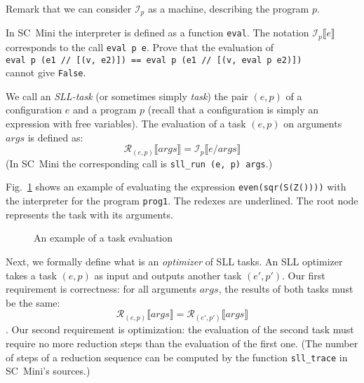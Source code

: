Remark that we can consider $\mathcal{I}_p$ as a machine, describing the program $p$.

\begin{exercise}
In SC~Mini the interpreter is defined as a function \texttt{eval}.
The notation $\mathcal{I}_p\llbracket e \rrbracket$ corresponds to the call \texttt{eval p e}.
Prove that the evaluation of
\\
\texttt{eval p (e1 // [(v, e2)]) == eval p (e1 // [(v, eval p e2)])}
\\
cannot give \texttt{False}.
\end{exercise}

We call an \emph{SLL-task}
(or sometimes simply \emph{task}) the pair $(e, p)$
of a configuration $e$ and a program $p$
(recall that a configuration is simply an expression with free variables). 
The evaluation of a task $(e, p)$ on arguments $args$ is defined as:
\[\mathcal{R}_{(e, p)}\llbracket args\rrbracket = \mathcal{I}_p\llbracket e / args\rrbracket\]
(In SC~Mini the corresponding call is \texttt{sll\_run (e, p) args}.)


Fig.~\ref{fig-sll-int} shows an example of evaluating the expression \texttt{even(sqr(S(Z())))} 
with the interpreter for the program \texttt{prog1}.
The redexes are underlined.
The root node represents the task with its arguments.

\begin{figure}[t!]
\caption{An example of a task evaluation}
\label{fig-sll-int}

\end{figure}

Next, we formally define what is an \emph{optimizer} of SLL tasks.
An SLL optimizer takes a task $(e, p)$ as input and outputs another task $(e', p')$.
Our first requirement is correctness:
for all arguments $args$, the results of both tasks must be the same:
\[\mathcal{R}_{(e, p)}\llbracket args\rrbracket = \mathcal{R}_{(e', p')}\llbracket args\rrbracket\].
Our second requirement is optimization: the evaluation of the second task must require no more reduction steps than
the evaluation of the first one. 
(The number of steps of a reduction sequence can be computed by
the function \texttt{sll\_trace} in SC~Mini's sources.)

